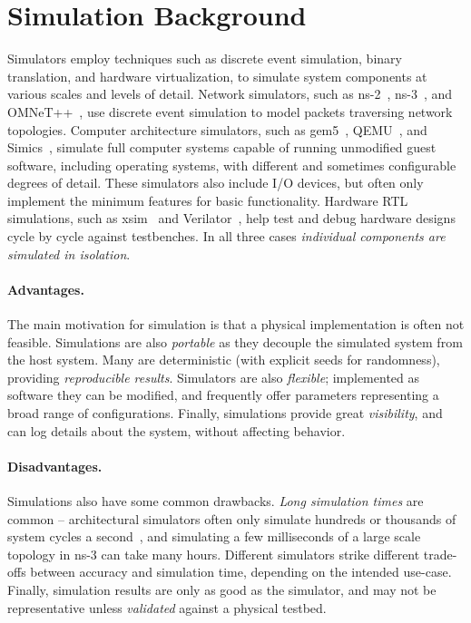 \section{Simulation Background}
Simulators employ techniques such as discrete event
simulation, binary translation, and hardware virtualization, to
simulate system components at various scales and levels of detail.
%
Network simulators, such as ns-2~\cite{software:ns2},
ns-3~\cite{software:ns3}, and OMNeT++~\cite{varga:omnetpp}, use
discrete event simulation to model packets traversing network
topologies.
%
Computer architecture simulators, such as gem5~\cite{binkert:gem5},
QEMU~\cite{software:qemu}, and Simics~\cite{magnusson:simics},
simulate full computer systems capable of running unmodified guest
software, including operating systems, with different and sometimes
configurable degrees of detail.
%
These simulators also include I/O devices, but often only implement
the minimum features for basic functionality.
%
Hardware RTL simulations, such as xsim~\cite{software:vivado_sim} and
Verilator~\cite{software:verilator}, help test and debug hardware
designs cycle by cycle against testbenches.
%
In all three cases
\emph{individual components are simulated in isolation}.

\paragraph{Advantages.}
The main motivation for simulation is that a physical implementation is often
not feasible.
%
Simulations are also \emph{portable}
as they decouple the simulated system from the host system.
%
Many are deterministic (with explicit seeds for randomness), providing
\emph{reproducible results}.
%
Simulators are also \emph{flexible}; implemented as software they can
be modified, and frequently offer parameters representing a broad
range of configurations.
%
Finally, simulations provide great \emph{visibility}, and can log
details about the system, without affecting behavior.

\paragraph{Disadvantages.}
Simulations also have some common drawbacks.
%
\emph{Long simulation times} are common -- architectural simulators
often only simulate hundreds or thousands of system cycles a
second~\cite{sutherland:nebula,karandikar:firesim}, and simulating a
few milliseconds of a large scale topology in ns-3 can take many
hours.
%
Different simulators strike different trade-offs between accuracy and
simulation time, depending on the intended use-case.
%
Finally, simulation results are only as good as the simulator, and may
not be representative unless \emph{validated} against a physical
testbed.


